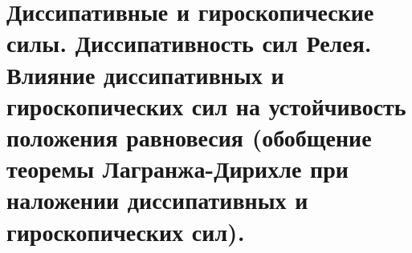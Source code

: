 \section{Диссипативные и гироскопические силы. Диссипативность сил Релея. Влияние диссипативных и гироскопических сил на устойчивость положения равновесия (обобщение теоремы Лагранжа-Дирихле при наложении диссипативных и гироскопических сил).}\label{chasec8}



\newpage